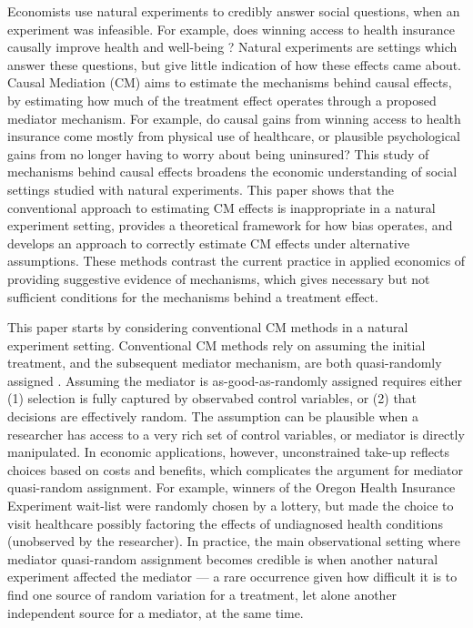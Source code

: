Economists use natural experiments to credibly answer social questions, when an experiment was infeasible.
For example, does winning access to health insurance causally improve health and well-being \citep{finkelstein2008oregon}?
Natural experiments are settings which answer these questions, but give little indication of how these effects came about.
Causal Mediation (CM) aims to estimate the mechanisms behind causal effects, by estimating how much of the treatment effect operates through a proposed mediator mechanism.
For example, do causal gains from winning access to health insurance come mostly from physical use of healthcare, or plausible psychological gains from no longer having to worry about being uninsured?
This study of mechanisms behind causal effects broadens the economic understanding of social settings studied with natural experiments.
This paper shows that the conventional approach to estimating CM effects is inappropriate in a natural experiment setting, provides a theoretical framework for how bias operates, and develops an approach to correctly estimate CM effects under alternative assumptions.
These methods contrast the current practice in applied economics of providing suggestive evidence of mechanisms, which gives necessary but not sufficient conditions for the mechanisms behind a treatment effect.


This paper starts by considering conventional CM methods in a natural experiment setting.
Conventional CM methods rely on assuming the initial treatment, and the subsequent mediator mechanism, are both quasi-randomly assigned \citep{imai2010identification}.
Assuming the mediator is as-good-as-randomly assigned requires either (1) selection is fully captured by observabed control variables, or (2) that decisions are effectively random.
The assumption can be plausible when a researcher has access to a very rich set of control variables, or mediator is directly manipulated.
In economic applications, however, unconstrained take-up reflects choices based on costs and benefits, which complicates the argument for mediator quasi-random assignment.
For example, winners of the Oregon Health Insurance Experiment wait-list were randomly chosen by a lottery, but made the choice to visit healthcare possibly factoring the effects of undiagnosed health conditions (unobserved by the researcher).
In practice, the main observational setting where mediator quasi-random assignment becomes credible is when another natural experiment affected the mediator --- a rare occurrence given how difficult it is to find one source of random variation for a treatment, let alone another independent source for a mediator, at the same time.

